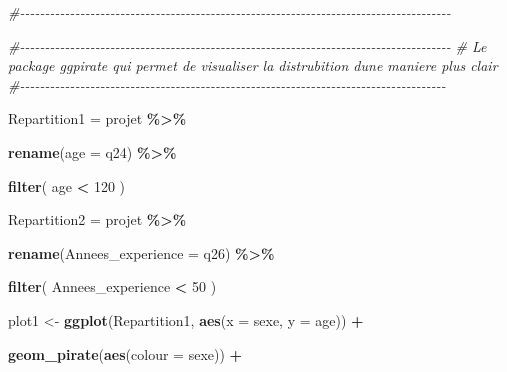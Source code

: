 \documentclass[
]{article}
\newenvironment{Shaded}{\begin{snugshade}}{\end{snugshade}}
\newcommand{\AttributeTok}[1]{\textcolor[rgb]{0.13,0.29,0.53}{#1}}
\newcommand{\CommentTok}[1]{\textcolor[rgb]{0.56,0.35,0.01}{\textit{#1}}}
\newcommand{\DecValTok}[1]{\textcolor[rgb]{0.00,0.00,0.81}{#1}}
\newcommand{\FunctionTok}[1]{\textcolor[rgb]{0.13,0.29,0.53}{\textbf{#1}}}
\newcommand{\NormalTok}[1]{#1}
\newcommand{\OtherTok}[1]{\textcolor[rgb]{0.56,0.35,0.01}{#1}}
\newcommand{\SpecialCharTok}[1]{\textcolor[rgb]{0.81,0.36,0.00}{\textbf{#1}}}
\begin{document}
\begin{Shaded}
\begin{Highlighting}[]
\CommentTok{\#{-}{-}{-}{-}{-}{-}{-}{-}{-}{-}{-}{-}{-}{-}{-}{-}{-}{-}{-}{-}{-}{-}{-}{-}{-}{-}{-}{-}{-}{-}{-}{-}{-}{-}{-}{-}{-}{-}{-}{-}{-}{-}{-}{-}{-}{-}{-}{-}{-}{-}{-}{-}{-}{-}{-}{-}{-}{-}{-}{-}{-}{-}{-}{-}{-}{-}{-}{-}{-}{-}{-}{-}{-}{-}{-}{-}{-}{-}{-}{-}{-}{-}{-}{-}{-}{-}}
\end{Highlighting}
\end{Shaded}

\begin{Shaded}
\begin{Highlighting}[]
\CommentTok{\#{-}{-}{-}{-}{-}{-}{-}{-}{-}{-}{-}{-}{-}{-}{-}{-}{-}{-}{-}{-}{-}{-}{-}{-}{-}{-}{-}{-}{-}{-}{-}{-}{-}{-}{-}{-}{-}{-}{-}{-}{-}{-}{-}{-}{-}{-}{-}{-}{-}{-}{-}{-}{-}{-}{-}{-}{-}{-}{-}{-}{-}{-}{-}{-}{-}{-}{-}{-}{-}{-}{-}{-}{-}{-}{-}{-}{-}{-}{-}{-}{-}{-}{-}{-}{-}{-}}
\CommentTok{\# Le package ggpirate qui permet de visualiser la distrubition d\textquotesingle{}une maniere plus clair}
\CommentTok{\#{-}{-}{-}{-}{-}{-}{-}{-}{-}{-}{-}{-}{-}{-}{-}{-}{-}{-}{-}{-}{-}{-}{-}{-}{-}{-}{-}{-}{-}{-}{-}{-}{-}{-}{-}{-}{-}{-}{-}{-}{-}{-}{-}{-}{-}{-}{-}{-}{-}{-}{-}{-}{-}{-}{-}{-}{-}{-}{-}{-}{-}{-}{-}{-}{-}{-}{-}{-}{-}{-}{-}{-}{-}{-}{-}{-}{-}{-}{-}{-}{-}{-}{-}{-}{-}}

\NormalTok{Repartition1 }\OtherTok{=}\NormalTok{ projet }\SpecialCharTok{\%\textgreater{}\%}
  
  \FunctionTok{rename}\NormalTok{(}\AttributeTok{age =}\NormalTok{ q24) }\SpecialCharTok{\%\textgreater{}\%} 
  
  \FunctionTok{filter}\NormalTok{( age }\SpecialCharTok{\textless{}} \DecValTok{120}\NormalTok{ )}


\NormalTok{Repartition2 }\OtherTok{=}\NormalTok{ projet }\SpecialCharTok{\%\textgreater{}\%}
  
  \FunctionTok{rename}\NormalTok{(}\AttributeTok{Annees\_experience =}\NormalTok{ q26) }\SpecialCharTok{\%\textgreater{}\%} 
  
  \FunctionTok{filter}\NormalTok{( Annees\_experience }\SpecialCharTok{\textless{}} \DecValTok{50}\NormalTok{ )}


\NormalTok{plot1 }\OtherTok{\textless{}{-}} \FunctionTok{ggplot}\NormalTok{(Repartition1, }\FunctionTok{aes}\NormalTok{(}\AttributeTok{x =}\NormalTok{ sexe, }\AttributeTok{y =}\NormalTok{ age)) }\SpecialCharTok{+}
  
  \FunctionTok{geom\_pirate}\NormalTok{(}\FunctionTok{aes}\NormalTok{(}\AttributeTok{colour =}\NormalTok{ sexe)) }\SpecialCharTok{+}
  

\end{Highlighting}
\end{Shaded}
\end{document}
